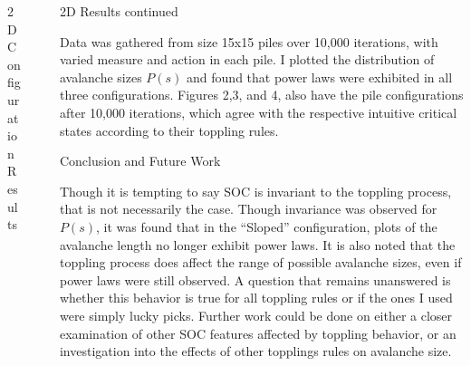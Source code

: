 \documentclass[final]{beamer}
\newlength{\sepwid}
\newlength{\onecolwid}
\begin{document}
\begin{frame}[t]
\begin{columns}[t]
\begin{column}{\onecolwid}
\begin{block}{2D Configuration Results}
\end{block}


\end{column} %

\begin{column}{\sepwid}\end{column} %

\begin{column}{\onecolwid} %


\begin{block}{2D Results continued}

Data was gathered from size 15x15 piles over 10,000 iterations, with varied measure and action in each pile. I plotted the distribution of avalanche sizes $P(s)$ and found that power laws were exhibited in all three configurations. Figures 2,3, and 4, also have the pile configurations after 10,000 iterations, which agree with the respective intuitive critical states according to their toppling rules.

\end{block}


\begin{block}{Conclusion and Future Work}

Though it is tempting to say SOC is invariant to the toppling process, that is not necessarily the case. Though invariance was observed for $P(s)$, it was found that in the ``Sloped'' configuration, plots of the avalanche length no longer exhibit power laws.
It is also noted that the toppling process does affect the range of possible avalanche sizes, even if power laws were still observed. A question that remains unanswered is whether this behavior is true for all toppling rules or if the ones I used were simply lucky picks.
Further work could be done on either a closer examination of other SOC features affected by toppling behavior, or an investigation into the effects of other topplings rules on avalanche size.


\end{block}
\end{column}
\end{columns}
\end{frame}
\end{document}
